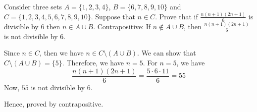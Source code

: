 \bp
Consider three sets $A = \{1, 2, 3, 4\}$, $B = \{6, 7, 8, 9, 10\}$ and $C = \{1, 2, 3, 4, 5, 6, 7, 8, 9, 10\}$. Suppose that $n \in C$.
Prove that if $\frac{n(n+1)(2n+1)}{6}$ is divisible by $6$ then $n \in A \cup B$.
\ep
\bs
Contrapositive: If $n \not\in A \cup B$, then $\frac{n(n+1)(2n+1)}{6}$ is not divisible by $6$.

Since $n \in C$, then we have $n \in C \setminus (A \cup B)$.
We can show that $C \setminus (A \cup B) = \{ 5 \}$. 
Therefore, we have $n = 5$. For $n = 5$, we have
$$\frac{n(n+1)(2n+1)}{6} = \frac{5 \cdot 6 \cdot 11}{6} = 55$$
Now, $55$ is not divisible by $6$.

Hence, proved by contrapositive.
\es

